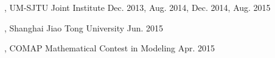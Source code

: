 \begin{cvhonors}  
  \cvhonor
    {, UM-SJTU Joint Institute} %
    {Dec. 2013, Aug. 2014, Dec. 2014, Aug. 2015} %
  \end{cvhonors}

\begin{cvhonors}
  \cvhonor
    {, Shanghai Jiao Tong University} %
    {Jun. 2015} %
  \end{cvhonors}
    
\begin{cvhonors}
  \cvhonor
    {, COMAP Mathematical Contest in Modeling} %
    {Apr. 2015} %
  \end{cvhonors}


